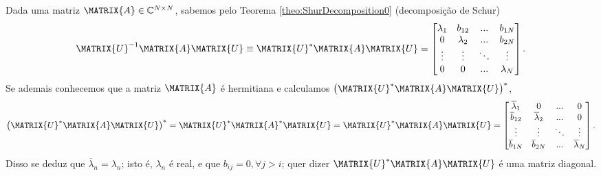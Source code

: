 \begin{myproofT}\label{proof:theo:HermitianDDecomposition0}
Dada uma matriz $\MATRIX{A} \in \mathbb{C}^{N \times N}$,
sabemos pelo Teorema \ref{theo:ShurDecomposition0} (decomposição de Schur)
\begin{equation}
\MATRIX{U}^{-1} \MATRIX{A} \MATRIX{U} \equiv
\MATRIX{U}^{\ast} \MATRIX{A} \MATRIX{U} =
\begin{bmatrix}
\lambda_1 & b_{12}    & ...    & b_{1N} \\
0         & \lambda_2 & ...    & b_{2N} \\
\vdots    & \vdots    & \ddots & \vdots \\
0         & 0         & ...    & \lambda_N
\end{bmatrix}.
\end{equation}
Se ademais conhecemos que a matriz $\MATRIX{A}$ é hermitiana  
e calculamos $\left(\MATRIX{U}^{\ast} \MATRIX{A} \MATRIX{U}\right)^{\ast}$,
\begin{equation}
\left(\MATRIX{U}^{\ast} \MATRIX{A} \MATRIX{U}\right)^{\ast} =
\MATRIX{U}^{\ast} \MATRIX{A}^{\ast} \MATRIX{U}  =
\MATRIX{U}^{\ast} \MATRIX{A} \MATRIX{U} =
\begin{bmatrix}
\overline{\lambda}_1 & 0                    & ...    & 0 \\
\overline{b}_{12}    & \overline{\lambda}_2 & ...    & 0 \\
\vdots               & \vdots               & \ddots & \vdots \\
\overline{b}_{1N}    & \overline{b}_{2N}    & ...    & \overline{\lambda}_N
\end{bmatrix}.
\end{equation}
Disso se deduz que $\overline{\lambda}_n=\lambda_n$; isto é, $\lambda_n$ é real,
e que  $b_{ij}=0, \forall j>i$; quer dizer $\MATRIX{U}^{\ast} \MATRIX{A} \MATRIX{U}$
é uma matriz diagonal.
\end{myproofT}


